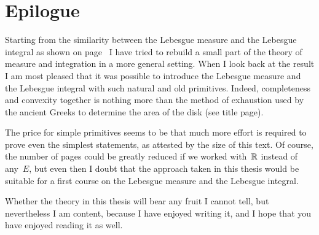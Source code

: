\documentclass[main.tex]{subfiles}
\begin{document}
\section{Epilogue}
\noindent
Starting from the similarity
between
 the Lebesgue measure
and the Lebesgue integral
as shown  on page~\pageref{S:intro}
I have tried to 
rebuild
a small part of the theory of
measure and integration 
in a more general setting.
When I look back at the result
I am most pleased that it was possible
to introduce the Lebesgue measure and the Lebesgue integral
with such natural and old primitives.
Indeed,
completeness and convexity
together
is nothing more than
the method of exhaustion
used by the ancient Greeks 
to determine the area of the disk (see title page).

The price for simple primitives
seems to be that much more effort is
required to prove even the simplest statements,
as attested by the size of this text.
Of course,
the number of pages could be
greatly reduced if we worked with~$\mathbb{R}$
instead of any~$E$,
but even then
I doubt that the approach taken
in this thesis would
be suitable
for a first course on the Lebesgue measure
and the Lebesgue integral.

Whether the theory in this thesis
will bear any fruit
I cannot tell,
but nevertheless I am content,
because I have enjoyed writing it,
and I hope that you have enjoyed reading it as well.
\label{S:conclusion}
\end{document}
